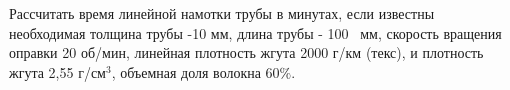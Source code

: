 
Рассчитать время линейной намотки трубы в минутах, если
известны необходимая толщина трубы -10 мм, длина трубы - 100  мм, скорость вращения оправки 20
об/мин, линейная плотность жгута 2000 г/км (текс), и плотность жгута 2,55 г/см$^3$,
объемная доля волокна $60\%$.